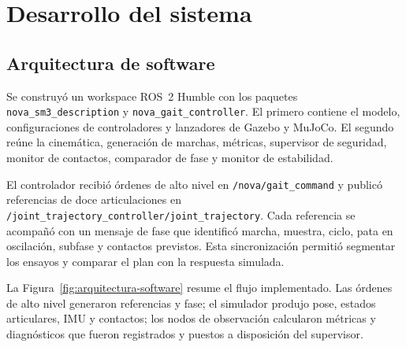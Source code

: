 \chapter{Desarrollo del sistema}

\section{Arquitectura de software}

Se construyó un workspace ROS~2 Humble con los paquetes
\texttt{nova\_sm3\_description} y \texttt{nova\_gait\_controller}. El primero
contiene el modelo, configuraciones de controladores y lanzadores de Gazebo y
MuJoCo. El segundo reúne la cinemática, generación de marchas, métricas,
supervisor de seguridad, monitor de contactos, comparador de fase y monitor de
estabilidad.

El controlador recibió órdenes de alto nivel en
\texttt{/nova/gait\_command} y publicó referencias de doce articulaciones en
\texttt{/joint\_trajectory\_controller/joint\_trajectory}. Cada referencia se
acompañó con un mensaje de fase que identificó marcha, muestra, ciclo, pata en
oscilación, subfase y contactos previstos. Esta sincronización permitió
segmentar los ensayos y comparar el plan con la respuesta simulada.

La Figura~\ref{fig:arquitectura-software} resume el flujo implementado. Las
órdenes de alto nivel generaron referencias y fase; el simulador produjo pose,
estados articulares, IMU y contactos; los nodos de observación calcularon
métricas y diagnósticos que fueron registrados y puestos a disposición del
supervisor.

